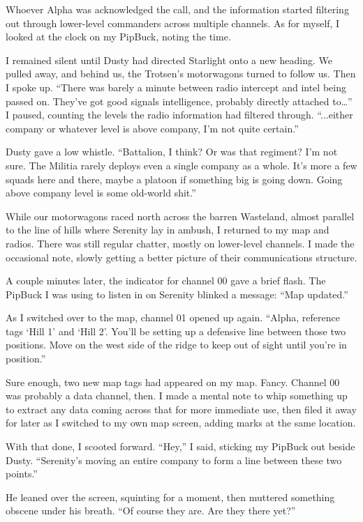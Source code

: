 Whoever Alpha was acknowledged the call, and the information started filtering out through lower-level commanders across multiple channels. As for myself, I looked at the clock on my PipBuck, noting the time.

I remained silent until Dusty had directed Starlight onto a new heading. We pulled away, and behind us, the Trotsen’s motorwagons turned to follow us. Then I spoke up. “There was barely a minute between radio intercept and intel being passed on. They’ve got good signals intelligence, probably directly attached to…” I paused, counting the levels the radio information had filtered through. “...either company or whatever level is above company, I’m not quite certain.”

Dusty gave a low whistle. “Battalion, I think? Or was that regiment? I’m not sure. The Militia rarely deploys even a single company as a whole. It’s more a few squads here and there, maybe a platoon if something big is going down. Going above company level is some old-world shit.”

While our motorwagons raced north across the barren Wasteland, almost parallel to the line of hills where Serenity lay in ambush, I returned to my map and radios. There was still regular chatter, mostly on lower-level channels. I made the occasional note, slowly getting a better picture of their communications structure.

A couple minutes later, the indicator for channel 00 gave a brief flash. The PipBuck I was using to listen in on Serenity blinked a message: “Map updated.”

As I switched over to the map, channel 01 opened up again. “Alpha, reference tags ‘Hill 1’ and ‘Hill 2’. You’ll be setting up a defensive line between those two positions. Move on the west side of the ridge to keep out of sight until you’re in position.”

Sure enough, two new map tags had appeared on my map. Fancy. Channel 00 was probably a data channel, then. I made a mental note to whip something up to extract any data coming across that for more immediate use, then filed it away for later as I switched to my own map screen, adding marks at the same location.

With that done, I scooted forward. “Hey,” I said, sticking my PipBuck out beside Dusty. “Serenity’s moving an entire company to form a line between these two points.”

He leaned over the screen, squinting for a moment, then muttered something obscene under his breath. “Of course they are. Are they there yet?”

